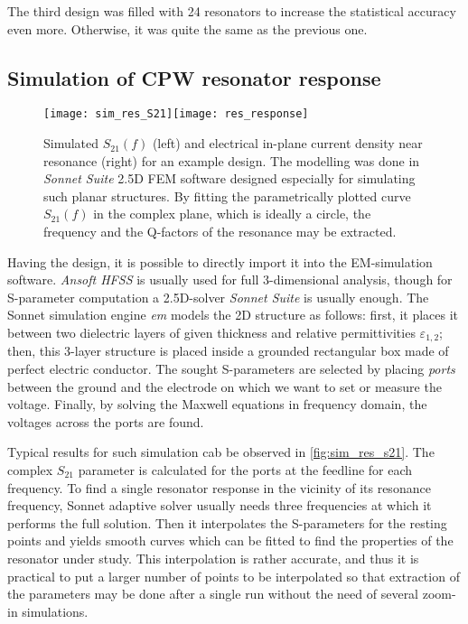 The third design was filled with 24 resonators to increase the statistical accuracy even more. Otherwise, it was quite the same as the previous one.

\subsection{Simulation of CPW resonator response}

\begin{figure}[t]
\centering
\texttt{[image: sim\_res\_S21]}\quad \texttt{[image: res\_response]}
\caption{Simulated $S_{21}(f)$ (left) and electrical in-plane current density near resonance (right) for an example design. The modelling was done in \textit{Sonnet Suite} 2.5D FEM software designed especially for simulating such planar structures. By fitting the parametrically plotted curve $S_{21}(f)$ in the complex plane, which is ideally a circle, the frequency and the Q-factors of the resonance may be extracted.}
\label{fig:sim_res_s21}
\end{figure}

Having the design, it is possible to directly import it into the EM-simulation software. \textit{Ansoft HFSS} is usually used for full 3-dimensional analysis, though for S-parameter computation a 2.5D-solver \textit{Sonnet Suite} is usually enough. The Sonnet simulation engine \textit{em} models the 2D structure as follows: first, it places it between two dielectric layers of given thickness and relative permittivities $\varepsilon_{1,2}$; then, this 3-layer structure is placed inside a grounded rectangular box made of perfect electric conductor. The sought S-parameters are selected by placing \textit{ports} between the ground and the electrode on which we want to set or measure the voltage. Finally, by solving the Maxwell equations in frequency domain, the voltages across the ports are found. 

Typical results for such simulation cab be observed in \autoref{fig:sim_res_s21}. The complex $S_{21}$ parameter is calculated for the ports at the feedline for each frequency. To find a single resonator response in the vicinity of its resonance frequency, Sonnet adaptive solver usually needs three frequencies at which it performs the full solution. Then it interpolates the S-parameters for the resting points and yields smooth curves which can be fitted to find the properties of the resonator under study. This interpolation is rather accurate, and thus it is practical to put a larger number of points to be interpolated so that extraction of the parameters may be done after a single run without the need of several zoom-in simulations.

